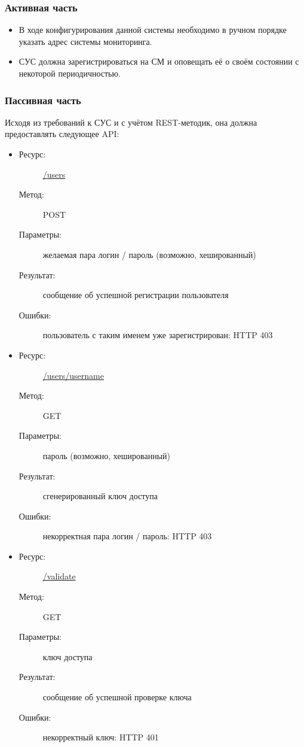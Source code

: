 \documentclass[a4paper,12pt]{report}
\numberwithin{equation}{section}
\begin{document}
\subsubsection{Активная часть}
\begin{itemize}
  \item В ходе конфигурирования данной системы необходимо в ручном порядке указать адрес системы мониторинга.
  \item СУС должна зарегистрироваться на СМ и оповещать её о своём состоянии с некоторой периодичностью.
\end{itemize}

\subsubsection{Пассивная часть}
Исходя из требований к СУС и с учётом REST-методик, она должна предоставлять следующее API:

\begin{itemize}
  \item
  \begin{description}
    \item[Ресурс:] \url{/users}
    \item[Метод:] POST
    \item[Параметры:] желаемая пара логин / пароль (возможно, хешированный)
    \item[Результат:] сообщение об успешной регистрации пользователя
    \item[Ошибки:] пользователь с таким именем уже зарегистрирован: HTTP 403
  \end{description}
  \item
  \begin{description}
    \item[Ресурс:] \url{/users/username}
    \item[Метод:] GET
    \item[Параметры:] пароль (возможно, хешированный)
    \item[Результат:] сгенерированный ключ доступа
    \item[Ошибки:] некорректная пара логин / пароль: HTTP 403
  \end{description}
  \item
  \begin{description}
    \item[Ресурс:] \url{/validate}
    \item[Метод:] GET
    \item[Параметры:] ключ доступа
    \item[Результат:] сообщение об успешной проверке ключа
    \item[Ошибки:] некорректный ключ: HTTP 401
  \end{description}
\end{itemize}
\end{document}
